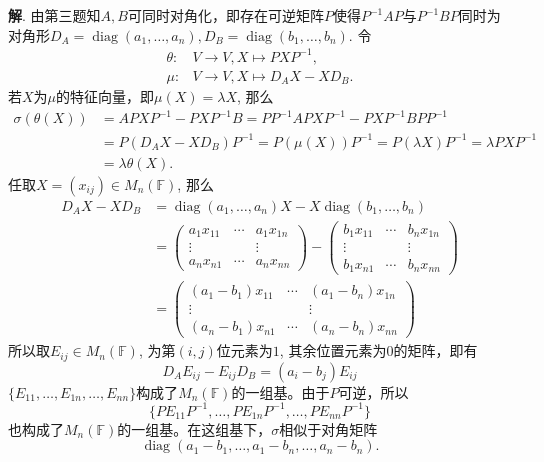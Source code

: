 {\bf 解}. 由第三题知$A,B$可同时对角化，即存在可逆矩阵$P$使得$P^{-1}AP$与$P^{-1}BP$同时为对角形$D_A = \operatorname{diag}(a_1, \ldots, a_n), D_B = \operatorname{diag}(b_1, \ldots, b_n)$.
令
\begin{align*}
\theta: & V \to V, X \mapsto PXP^{-1},\\
\mu: & V \to V, X \mapsto D_A X - X D_B.
\end{align*}
若$X$为$\mu$的特征向量，即$\mu(X) = \lambda X$, 那么
\begin{align*}
\sigma(\theta(X)) & = A PXP^{-1} - PXP^{-1} B = PP^{-1}APXP^{-1} - PXP^{-1}BPP^{-1} \\
& = P(D_AX - XD_B)P^{-1} = P(\mu(X))P^{-1} = P (\lambda X) P^{-1} = \lambda PXP^{-1} \\
& = \lambda \theta(X).
\end{align*}
任取$X = (x_{ij}) \in M_n (\mathbb{F})$, 那么
\begin{align*}
D_AX - XD_B & = \operatorname{diag}(a_1, \ldots, a_n) X - X \operatorname{diag}(b_1, \ldots, b_n) \\
& = \begin{pmatrix} a_1x_{11} & \cdots & a_1x_{1n} \\ \vdots & & \vdots \\ a_nx_{n1} & \cdots & a_nx_{nn} \end{pmatrix} - \begin{pmatrix} b_1x_{11} & \cdots & b_nx_{1n} \\ \vdots & & \vdots \\ b_1x_{n1} & \cdots & b_nx_{nn} \end{pmatrix} \\
& = \begin{pmatrix} (a_1-b_1)x_{11} & \cdots & (a_1-b_n)x_{1n} \\ \vdots & & \vdots \\ (a_n-b_1)x_{n1} & \cdots & (a_n-b_n)x_{nn} \end{pmatrix}
\end{align*}
所以取$E_{ij} \in M_n (\mathbb{F})$, 为第$(i,j)$位元素为$1$, 其余位置元素为$0$的矩阵，即有
$$D_AE_{ij} - E_{ij}D_B = (a_i-b_j)E_{ij}$$
$\{ E_{11}, \ldots, E_{1n}, \ldots, E_{nn}\}$构成了$M_n (\mathbb{F}) $的一组基。由于$P$可逆，所以
$$\{ PE_{11}P^{-1}, \ldots, PE_{1n}P^{-1}, \ldots, PE_{nn}P^{-1} \}$$
也构成了$M_n (\mathbb{F})$的一组基。在这组基下，$\sigma$相似于对角矩阵
$$\operatorname{diag}(a_1-b_1, \ldots, a_1-b_n, \ldots, a_n-b_n).$$


